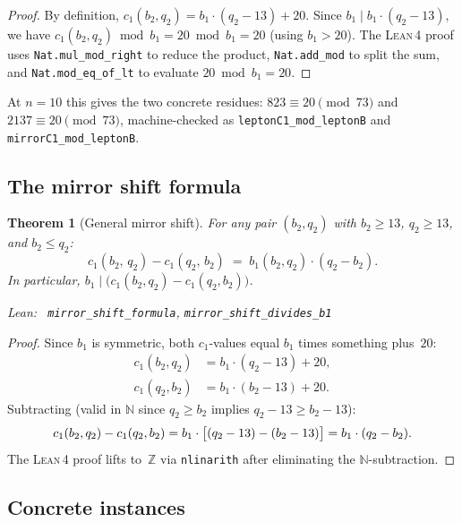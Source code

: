 \documentclass[11pt,a4paper]{article}
\newenvironment{leanref}%
  {\par\smallskip\noindent\begingroup\raggedright\textup{Lean:}~}%
  {\par\endgroup}
\newtheorem{theorem}{Theorem}[section]
\theoremstyle{definition}
\newcommand{\lean}{\textsc{Lean}\,4}
\newcommand{\N}{\mathbb{N}}
\begin{document}
\begin{proof}
By definition, $c_1(b_2, q_2) = b_1 \cdot (q_2 - 13) + 20$.
Since $b_1 \mid b_1 \cdot (q_2 - 13)$, we have
$c_1(b_2,q_2) \bmod b_1 = 20 \bmod b_1 = 20$ (using $b_1 > 20$).
The \lean{} proof uses \lstinline|Nat.mul_mod_right| to reduce the
product, \lstinline|Nat.add_mod| to split the sum, and
\lstinline|Nat.mod_eq_of_lt| to evaluate $20 \bmod b_1 = 20$.
\end{proof}

At $n = 10$ this gives the two concrete residues:
$823 \equiv 20 \pmod{73}$ and $2137 \equiv 20 \pmod{73}$,
machine-checked as \lstinline|leptonC1_mod_leptonB| and
\lstinline|mirrorC1_mod_leptonB|.

\subsection{The mirror shift formula}

\begin{theorem}[General mirror shift]\label{thm:mirror-shift}
For any pair $(b_2, q_2)$ with $b_2 \ge 13$, $q_2 \ge 13$,
and $b_2 \le q_2$:
\[
  c_1(b_2,\, q_2) - c_1(q_2,\, b_2)
  \;=\; b_1(b_2,q_2) \cdot (q_2 - b_2).
\]
In particular, $b_1 \mid \bigl(c_1(b_2,q_2) - c_1(q_2,b_2)\bigr)$.

\begin{leanref} \lstinline|mirror_shift_formula|,
\lstinline|mirror_shift_divides_b1|
\end{leanref}
\end{theorem}

\begin{proof}
Since $b_1$ is symmetric, both $c_1$-values equal $b_1$ times
something plus~$20$:
\begin{align*}
  c_1(b_2,q_2) &= b_1 \cdot (q_2 - 13) + 20, \\
  c_1(q_2,b_2) &= b_1 \cdot (b_2 - 13) + 20.
\end{align*}
Subtracting (valid in $\N$ since $q_2 \ge b_2$ implies
$q_2 - 13 \ge b_2 - 13$):
\[
  c_1(b_2,q_2) - c_1(q_2,b_2)
  = b_1 \cdot \bigl[(q_2 - 13) - (b_2 - 13)\bigr]
  = b_1 \cdot (q_2 - b_2). \qedhere
\]
The \lean{} proof lifts to~$\mathbb{Z}$ via \lstinline|nlinarith| after
eliminating the $\N$-subtraction.
\end{proof}

\subsection{Concrete instances}
\end{document}
